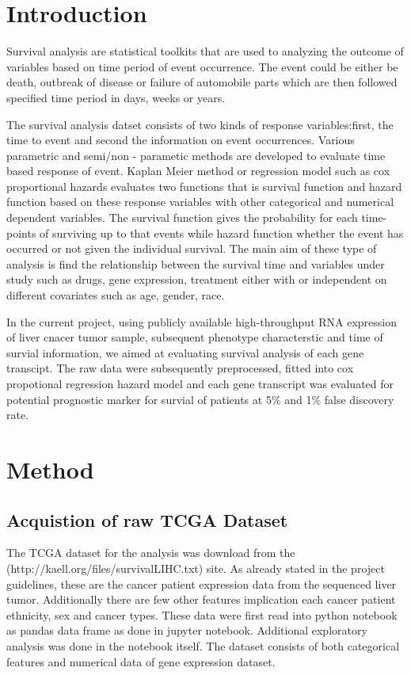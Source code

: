 \documentclass{article}
\title{\vspace{-4cm}{TCGA Liver cancer survival analysis of expressed gene transcript}}
\author{ Sailendra Pradhananga (sailendra.pradhanaga@scilifelab.se)\\ 
			Project Report:Algorithms in Bioinformatics\\ 
			KTH Royal Institute Of Technology}
\begin{document}
\section{Introduction}

Survival analysis are statistical toolkits that are used to analyzing the outcome of variables based on time period of event occurrence. The event could be either be death, outbreak of disease or failure of automobile parts which are then followed specified time period in days, weeks or years. 

The survival analysis datset consists of two kinds of response variables:first, the time to event and second the information on event occurrences. Various parametric and semi/non - parametic methods are developed to evaluate time based response of event. Kaplan Meier method or regression model such as cox proportional hazards evaluates two functions that is  survival function and hazard function  based on these response variables with other categorical and numerical dependent variables. The survival function gives the probability  for each time-points of surviving up to that events while hazard function whether the event has occurred or not  given the individual survival. The main aim of these type of analysis is find the relationship between the survival time and variables under study such as drugs, gene expression, treatment either with or independent on different covariates such as age, gender, race.

In the current project, using publicly available high-throughput RNA expression of liver cnacer tumor sample, subsequent phenotype characterstic and time of survial information, we aimed at evaluating survival analysis of each gene transcipt. The raw data were subsequently preprocessed, fitted into cox propotional regression hazard model and each gene transcript was evaluated for potential prognostic marker for survial of patients at 5\% and 1\% false discovery rate.
 

\section{Method}

	\subsection{Acquistion of raw TCGA Dataset}
The  TCGA dataset for the analysis was download from the (http://kaell.org/files/survivalLIHC.txt) site. As already stated in the project guidelines, these are the cancer patient expression data from the sequenced liver tumor.  Additionally there are few other features implication each cancer patient ethnicity, sex and cancer types.  These data were first read into python notebook as pandas data frame  as done in  jupyter notebook.  Additional exploratory analysis was done in the notebook itself. The  dataset consists of both categorical features and numerical data of gene expression dataset. 
\end{document}
